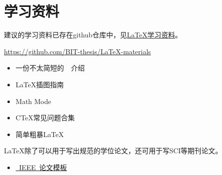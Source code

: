 \chapter{学习资料}
\label{chap:material}

建议的学习资料已存在github仓库中，见\href{https://github.com/BIT-thesis/LaTeX-materials}{LaTeX学习资料}。

\url{https://github.com/BIT-thesis/LaTeX-materials}

\begin{itemize}

\item 一份不太简短的~\LaTeXe{}~介绍
\item \LaTeX 插图指南
\item Math Mode
\item C\TeX 常见问题合集
\item 简单粗暴LaTeX

\end{itemize}

\LaTeX 除了可以用于写出规范的学位论文，还可用于写SCI等期刊论文。

\begin{itemize}
\item \href{http://www.ctan.org/tex-archive/macros/latex/contrib/IEEEtran/}{~IEEE~论文模板}

\end{itemize}